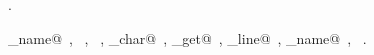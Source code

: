 \documentclass{report}
\begin{document}
\begin{flushleft}
\begin{minipage}{\linewidth}
\begin{list}{}{\setlength{\itemsep}{-\parsep}\setlength{\itemindent}{-\leftmargin}}
\item \NWtxtMacroRefIn\ .
\end{list}
\vspace{-2ex}
\footnotesize\addtolength{\baselineskip}{-1ex}
\begin{list}{}{\setlength{\itemsep}{-\parsep}\setlength{\itemindent}{-\leftmargin}}
\item \NWtxtIdentsUsed\nobreak\  \verb@command_name@\nobreak\ , \verb@exit@\nobreak\ , \verb@fprintf@\nobreak\ , \verb@nw_char@\nobreak\ , \verb@source_get@\nobreak\ , \verb@source_line@\nobreak\ , \verb@source_name@\nobreak\ , \verb@stderr@\nobreak\ .\end{list}
\end{minipage}\\[4ex]
\end{flushleft}
\end{document}
